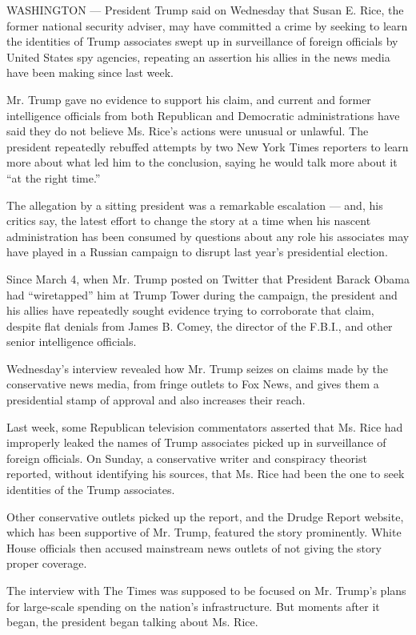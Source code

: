 WASHINGTON --- President Trump said on Wednesday that Susan E. Rice, the
former national security adviser, may have committed a crime by seeking
to learn the identities of Trump associates swept up in surveillance of
foreign officials by United States spy agencies, repeating an assertion
his allies in the news media have been making since last week.

Mr. Trump gave no evidence to support his claim, and current and former
intelligence officials from both Republican and Democratic
administrations have said they do not believe Ms. Rice's actions were
unusual or unlawful. The president repeatedly rebuffed attempts by two
New York Times reporters to learn more about what led him to the
conclusion, saying he would talk more about it ``at the right time.''

The allegation by a sitting president was a remarkable escalation ---
and, his critics say, the latest effort to change the story at a time
when his nascent administration has been consumed by questions about any
role his associates may have played in a Russian campaign to disrupt
last year's presidential election.

Since March 4, when Mr. Trump posted on Twitter that President Barack
Obama had ``wiretapped'' him at Trump Tower during the campaign, the
president and his allies have repeatedly sought evidence trying to
corroborate that claim, despite flat denials from James B. Comey, the
director of the F.B.I., and other senior intelligence officials.

Wednesday's interview revealed how Mr. Trump seizes on claims made by
the conservative news media, from fringe outlets to Fox News, and gives
them a presidential stamp of approval and also increases their reach.

Last week, some Republican television commentators asserted that Ms.
Rice had improperly leaked the names of Trump associates picked up in
surveillance of foreign officials. On Sunday, a conservative writer and
conspiracy theorist reported, without identifying his sources, that Ms.
Rice had been the one to seek identities of the Trump associates.

Other conservative outlets picked up the report, and the Drudge Report
website, which has been supportive of Mr. Trump, featured the story
prominently. White House officials then accused mainstream news outlets
of not giving the story proper coverage.

The interview with The Times was supposed to be focused on Mr. Trump's
plans for large-scale spending on the nation's infrastructure. But
moments after it began, the president began talking about Ms. Rice.

